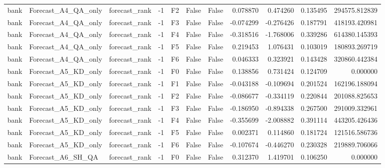 \begin{tabular}{lllrlllrrrr}
      bank &          Forecast\_A4\_QA\_only & forecast\_rank &    -1 &  F2 &           False &            False &  0.078870 &  0.474260 & 0.135495 &    294575.812839 \\
      bank &          Forecast\_A4\_QA\_only & forecast\_rank &    -1 &  F3 &           False &            False & -0.074299 & -0.276426 & 0.187791 &    418193.420981 \\
      bank &          Forecast\_A4\_QA\_only & forecast\_rank &    -1 &  F4 &           False &            False & -0.318516 & -1.768006 & 0.339286 &    614380.145393 \\
      bank &          Forecast\_A4\_QA\_only & forecast\_rank &    -1 &  F5 &           False &            False &  0.219453 &  1.076431 & 0.103019 &    180893.269719 \\
      bank &          Forecast\_A4\_QA\_only & forecast\_rank &    -1 &  F6 &           False &            False &  0.046333 &  0.323921 & 0.143428 &    320860.442384 \\
      bank &          Forecast\_A5\_KD\_only & forecast\_rank &    -1 &  F0 &           False &            False &  0.138856 &  0.731424 & 0.124709 &         0.000000 \\
      bank &          Forecast\_A5\_KD\_only & forecast\_rank &    -1 &  F1 &           False &            False & -0.043188 & -0.109694 & 0.201524 &    162196.188094 \\
      bank &          Forecast\_A5\_KD\_only & forecast\_rank &    -1 &  F2 &           False &            False & -0.086677 & -0.334119 & 0.220844 &    201088.825653 \\
      bank &          Forecast\_A5\_KD\_only & forecast\_rank &    -1 &  F3 &           False &            False & -0.186950 & -0.894338 & 0.267500 &    291009.332961 \\
      bank &          Forecast\_A5\_KD\_only & forecast\_rank &    -1 &  F4 &           False &            False & -0.355699 & -2.008882 & 0.391114 &    443205.426436 \\
      bank &          Forecast\_A5\_KD\_only & forecast\_rank &    -1 &  F5 &           False &            False &  0.002371 &  0.114860 & 0.181724 &    121516.586736 \\
      bank &          Forecast\_A5\_KD\_only & forecast\_rank &    -1 &  F6 &           False &            False & -0.107674 & -0.446270 & 0.230328 &    219889.706066 \\
      bank &            Forecast\_A6\_SH\_QA & forecast\_rank &    -1 &  F0 &           False &            False &  0.312370 &  1.419701 & 0.106250 &         0.000000 \\

\end{tabular}
